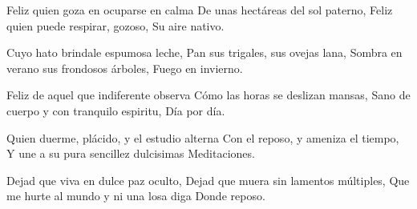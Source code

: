 \startlanguage[es]
\startlines
Feliz quien goza en ocuparse en calma
De unas hectáreas del sol paterno,
Feliz quien puede respirar, gozoso,
Su aire nativo.

Cuyo hato brindale espumosa leche,
Pan sus trigales, sus ovejas lana,
Sombra en verano sus frondosos árboles,
Fuego en invierno.

Feliz de aquel que indiferente observa
Cómo las horas se deslizan mansas,
Sano de cuerpo y con tranquilo espiritu,
Día por día.

Quien duerme, plácido, y el estudio alterna
Con el reposo, y ameniza el tiempo,
Y une a su pura sencillez dulcisimas
Meditaciones.

Dejad que viva en dulce paz oculto,
Dejad que muera sin lamentos múltiples,
Que me hurte al mundo y ni una losa diga
Donde reposo.
\stoplines
\stoplanguage
